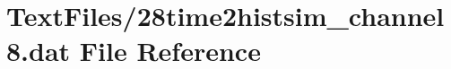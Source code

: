 \hypertarget{28time2histsim__channel8_8dat}{}\section{Text\+Files/28time2histsim\+\_\+channel8.dat File Reference}
\label{28time2histsim__channel8_8dat}
